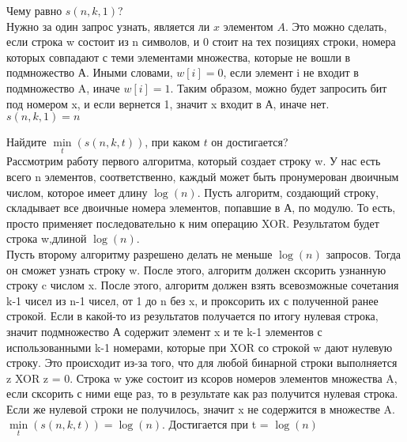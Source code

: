 \documentclass[12pt]{extreport}
\theoremstyle{definiton}
\theoremstyle{definition}
\theoremstyle{definition}
\newcounter{problem}
\newcounter{subproblem}
\def\PRSUBskip{
	\medskip
}
\def\prsub{\PRSUBskip\noindent\stepcounter{subproblem}{\sf \thesubproblem.}\;}
\begin{document}
			\prsub Чему равно $s(n,k,1)$?
			\newline
			\\ Нужно за один запрос узнать, является ли $x$ элементом $A$. Это можно сделать, если строка w состоит из n символов, и 0 стоит на тех позициях строки, номера которых совпадают с теми элементами множества, которые не вошли в подмножество А. Иными словами, $w[i]=0$, если элемент i не входит в подмножество A, иначе $w[i]=1$. Таким образом, можно будет запросить бит под номером x, и если вернется 1, значит x входит в А, иначе нет.
			\\$s(n,k,1)=n$

			\prsub Найдите $\min\limits_t( s(n,k,t))$, при каком $t$ он достигается?
			\newline
			\\ Рассмотрим работу первого алгоритма, который создает строку w. У нас есть всего n элементов, соответственно, каждый может быть пронумерован двоичным числом, которое имеет длину $\log(n)$. Пусть алгоритм, создающий строку, складывает все двоичные номера элементов, попавшие в А, по модулю. То есть, просто применяет последовательно к ним операцию XOR. Результатом будет строка w,длиной $\log(n)$.
			\\ Пусть второму алгоритму разрешено делать не меньше $\log(n)$ запросов. Тогда он сможет узнать строку w. После этого, алгоритм должен сксорить узнанную строку c числом x. После этого, алгоритм должен взять всевозможные сочетания k-1 чисел из n-1 чисел, от 1 до n без x, и проксорить их с полученной ранее строкой. Если в какой-то из результатов получается по итогу нулевая строка, значит подмножество А содержит элемент x и те k-1 элементов с использованными k-1 номерами, которые при XOR со строкой w дают нулевую строку. Это происходит из-за того, что для любой бинарной строки выполняется z XOR z = 0. Строка w уже состоит из ксоров номеров элементов множества A, если сксорить с ними еще раз, то в результате как раз получится нулевая строка. Если же нулевой строки не получилось, значит x не содержится в множестве A.
			\\$\min\limits_t( s(n,k,t))=\log(n)$. Достигается при t = $\log(n)$
\end{document}

